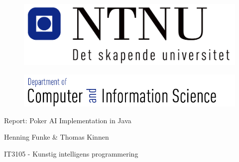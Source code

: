 \pagestyle{empty}

\begin{titlepage}
\begin{center}

\begin{figure}[!htb]
	\begin{center}
		\includegraphics[scale=0.50]{pics/ntnu}
	\end{center}
\end{figure}
\begin{figure}[!htb]
	\begin{center}
		\includegraphics[scale=0.40]{pics/idi}
	\end{center}
\end{figure}
\begin{LARGE}
\vspace{1.2in}

\end{LARGE}
\begin{Huge}
Report: Poker AI Implementation in Java
\vspace{1.7in}


\end{Huge}
\begin{LARGE}
Henning Funke \& Thomas Kinnen \vspace{0.6in}
\end{LARGE}

\begin{Large}
IT3105 - Kunstig intelligens programmering
\vspace{0.8in}
\end{Large}



\end{center}

\end{titlepage}
